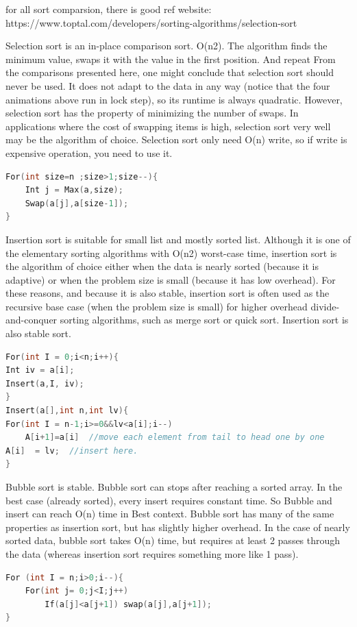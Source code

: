 \documentclass[a4paper,11pt,twoside]{book}
\begin{document}
 

	\par for all sort comparsion, there is good ref website: \newline  https://www.toptal.com/developers/sorting-algorithms/selection-sort

	\par Selection sort is an in-place comparison sort. O(n2). The algorithm finds the minimum value, swaps it with the value in the first position.  And repeat From the comparisons presented here, one might conclude that selection sort should never be used. It does not adapt to the data in any way (notice that the four animations above run in lock step), so its runtime is always quadratic. However, selection sort has the property of minimizing the number of swaps. In applications where the cost of swapping items is high, selection sort very well may be the algorithm of choice. Selection sort only need O(n) write, so if write is expensive operation, you need to use it. 
\begin{lstlisting}[frame=single, language=c++]
For(int size=n ;size>1;size--){
	Int j = Max(a,size);
	Swap(a[j],a[size-1]);
}
\end{lstlisting}

	\par Insertion sort is suitable for small list and mostly sorted list. Although it is one of the elementary sorting algorithms with O(n2) worst-case time, insertion sort is the algorithm of choice either when the data is nearly sorted (because it is adaptive) or when the problem size is small (because it has low overhead). For these reasons, and because it is also stable, insertion sort is often used as the recursive base case (when the problem size is small) for higher overhead divide-and-conquer sorting algorithms, such as merge sort or quick sort. Insertion sort is also stable sort. 

\begin{lstlisting}[frame=single, language=c++]
For(int I = 0;i<n;i++){
Int iv = a[i];
Insert(a,I, iv);
}
Insert(a[],int n,int lv){
For(int I = n-1;i>=0&&lv<a[i];i--)
    A[i+1]=a[i]  //move each element from tail to head one by one
A[i]  = lv;  //insert here. 
}
\end{lstlisting}

	\par Bubble sort is stable. Bubble sort can stops after reaching a sorted array. In the best case (already sorted), every insert requires constant time. So Bubble and insert can reach O(n) time in Best context. Bubble sort has many of the same properties as insertion sort, but has slightly higher overhead. In the case of nearly sorted data, bubble sort takes O(n) time, but requires at least 2 passes through the data (whereas insertion sort requires something more like 1 pass).
\begin{lstlisting}[frame=single, language=c++]
For (int I = n;i>0;i--){
	For(int j= 0;j<I;j++)
		If(a[j]<a[j+1]) swap(a[j],a[j+1]);
}
\end{lstlisting}
\end{document}
